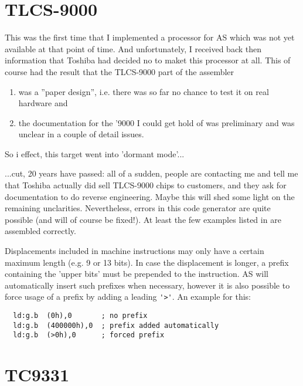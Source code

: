 \documentclass[12pt,twoside]{report}
\begin{document}

\section{TLCS-9000}

This was the first time that I implemented a processor for AS which
was not yet available at that point of time.  And unfortunately,
I received back then information that Toshiba had decided no to
maket this processor at all.  This of course had the result that
the TLCS-9000 part of the assembler
\begin{enumerate}
\item{was a ''paper design'', i.e. there was so far no chance to test
      it on real hardware and}
\item{the documentation for the '9000 I could get hold of \cite{Tosh9000}
      was preliminary and was unclear in a couple of detail
      issues.}
\end{enumerate}
So i effect, this target went into 'dormant mode'...

...cut, 20 years have passed: all of a sudden, people are
contacting me and tell me that Toshiba actually did sell
TLCS-9000 chips to customers, and they ask for documentation to
do reverse engineering.  Maybe this will shed some light on the
remaining unclarities.  Nevertheless, errors in this code generator
are quite possible (and will of course be fixed!).  At least the
few examples listed in \cite{Tosh9000} are assembled correctly.

Displacements included in machine instructions may only have a
certain maximum length (e.g. 9 or 13 bits).  In case the
displacement is longer, a prefix containing the 'upper bits' must
be prepended to the instruction.  AS will automatically insert
such prefixes when necessary, however it is also possible to
force usage of a prefix by adding a leading \verb!'>'!.  An
example for this:

\begin{verbatim}
  ld:g.b  (0h),0       ; no prefix
  ld:g.b  (400000h),0  ; prefix added automatically
  ld:g.b  (>0h),0      ; forced prefix
\end{verbatim}


\section{TC9331}
\end{document}
